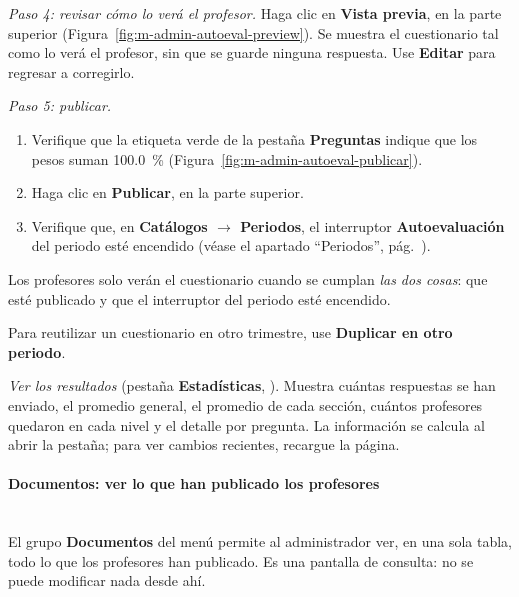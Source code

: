 \textit{Paso 4: revisar cómo lo verá el profesor.} Haga clic en \textbf{Vista previa}, en la parte superior (Figura~\ref{fig:m-admin-autoeval-preview}). Se muestra el cuestionario tal como lo verá el profesor, sin que se guarde ninguna respuesta. Use \textbf{Editar} para regresar a corregirlo.


\textit{Paso 5: publicar.}
\begin{enumerate}
    \item Verifique que la etiqueta verde de la pestaña \textbf{Preguntas} indique que los pesos suman 100.0~\% (Figura~\ref{fig:m-admin-autoeval-publicar}).
    \item Haga clic en \textbf{Publicar}, en la parte superior.
    \item Verifique que, en \textbf{Catálogos $\to$ Periodos}, el interruptor \textbf{Autoevaluación} del periodo esté encendido (véase el apartado ``Periodos'', pág.~\pageref{apx:manual-user:admin-periodos}).
\end{enumerate}


Los profesores solo verán el cuestionario cuando se cumplan \emph{las dos cosas}: que esté publicado y que el interruptor del periodo esté encendido.

Para reutilizar un cuestionario en otro trimestre, use \textbf{Duplicar en otro periodo}.

\textit{Ver los resultados} (pestaña \textbf{Estadísticas}, ). Muestra cuántas respuestas se han enviado, el promedio general, el promedio de cada sección, cuántos profesores quedaron en cada nivel y el detalle por pregunta. La información se calcula al abrir la pestaña; para ver cambios recientes, recargue la página.

\paragraph{Documentos: ver lo que han publicado los profesores}\label{apx:manual-user:admin-documentos}\mbox{}\\
El grupo \textbf{Documentos} del menú permite al administrador ver, en una sola tabla, todo lo que los profesores han publicado. Es una pantalla de consulta: no se puede modificar nada desde ahí.

